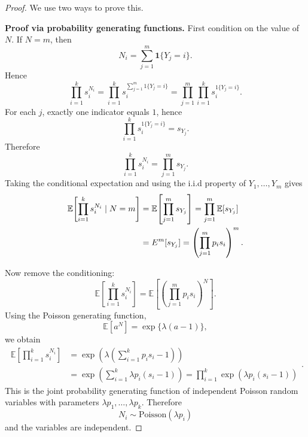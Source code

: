 \documentclass[12pt]{article}
\renewcommand{\(}{\left(}%
\renewcommand{\)}{\right)}%
\renewcommand{\[}{\left[}%
\renewcommand{\]}{\right]}%
\newcommand{\e}{\mathscr{E}}
\newtheorem{proof}{Proof.}}
\begin{document}
\begin{proof}
We use two ways to prove this.

\noindent
{\bfseries Proof via probability generating functions.} 
First condition on the value of $N$.
If $N=m$, then
\begin{equation*}
N_i=\sum_{j=1}^{m}\mathbf 1\{Y_j=i\}.
\end{equation*}
Hence
\begin{equation*}
\prod_{i=1}^k s_i^{N_i}
=
\prod_{i=1}^k s_i^{\sum_{j=1}^m 1\{Y_j=i\}}
=
\prod_{j=1}^m \prod_{i=1}^k s_i^{1\{Y_j=i\}}.
\end{equation*}
For each $j$, exactly one indicator equals $1$, hence
\begin{equation*}
\prod_{i=1}^k s_i^{1\{Y_j=i\}} = s_{Y_j}.
\end{equation*}
Therefore
\begin{equation*}
\prod_{i=1}^k s_i^{N_i}=\prod_{j=1}^m s_{Y_j}.
\end{equation*}
Taking the conditional expectation and using the i.i.d property of $Y_1,\dots,Y_m$ gives
\begin{equation*}
\begin{split}
	\mathbb E\!\left[\prod_{i=1}^k s_i^{N_i}\mid N=m\right]
&=
\mathbb E\!\left[\prod_{j=1}^m s_{Y_j}\right]=
\prod_{j=1}^m \mathbb E[s_{Y_j}]\\
&=\mathbb \e^m[s_{Y_j}]=\(\prod_{j=1}^m
 p_i s_i\)^m.
\end{split}
\end{equation*}

Now remove the conditioning:
\begin{equation*}
\mathbb E\!\left[\prod_{i=1}^k s_i^{N_i}\right]
=
\mathbb E\!\left[\(\prod_{j=1}^m
 p_i s_i\)^N\right].
\end{equation*}
Using the Poisson generating function,
\begin{equation*}
\mathbb E[a^N]=\exp\{\lambda(a-1)\},
\end{equation*}
we obtain
\begin{equation*}
\begin{split}
	\mathbb E\!\left[\prod_{i=1}^k s_i^{N_i}\right]
&=
\exp\!\left(\lambda\left(\sum_{i=1}^k p_i s_i-1\right)\right)\\
&=
\exp\!\left(\sum_{i=1}^k \lambda p_i (s_i-1)\right)
=
\prod_{i=1}^k \exp\!\left(\lambda p_i (s_i-1)\right)
\end{split}
.
\end{equation*}
This is the joint probability generating function of independent
Poisson random variables with parameters $\lambda p_1,\dots,\lambda p_k$.
Therefore
\begin{equation*}
N_i \sim \mathrm{Poisson}(\lambda p_i)
\end{equation*}
and the variables are independent.


\end{proof}
\end{document}
